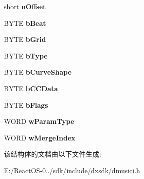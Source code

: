\begin{DoxyCompactItemize}
\item 
\mbox{\label{struct___d_m_u_s___c_u_r_v_e___p_m_s_g_a8b333c0d2ea156632d3e1329f680b70c}} 
short {\bfseries n\+Offset}
\item 
\mbox{\label{struct___d_m_u_s___c_u_r_v_e___p_m_s_g_a7d2f27715e230615d524f69a872780bd}} 
B\+Y\+TE {\bfseries b\+Beat}
\item 
\mbox{\label{struct___d_m_u_s___c_u_r_v_e___p_m_s_g_ab21b62e9a1f103e9eeb252a373531eb8}} 
B\+Y\+TE {\bfseries b\+Grid}
\item 
\mbox{\label{struct___d_m_u_s___c_u_r_v_e___p_m_s_g_aeb9d4603c54f1a8a19f0159c309634a9}} 
B\+Y\+TE {\bfseries b\+Type}
\item 
\mbox{\label{struct___d_m_u_s___c_u_r_v_e___p_m_s_g_a9156ca984261c0cfa4b21a504646f003}} 
B\+Y\+TE {\bfseries b\+Curve\+Shape}
\item 
\mbox{\label{struct___d_m_u_s___c_u_r_v_e___p_m_s_g_aeef8867da36fa2601f1a100112beb92a}} 
B\+Y\+TE {\bfseries b\+C\+C\+Data}
\item 
\mbox{\label{struct___d_m_u_s___c_u_r_v_e___p_m_s_g_a9bf622525321e618afdc0653288703fd}} 
B\+Y\+TE {\bfseries b\+Flags}
\item 
\mbox{\label{struct___d_m_u_s___c_u_r_v_e___p_m_s_g_a9ac4c685f4adad3c2f1513aee30074e8}} 
W\+O\+RD {\bfseries w\+Param\+Type}
\item 
\mbox{\label{struct___d_m_u_s___c_u_r_v_e___p_m_s_g_a0df32dd8be9c5180917c67744d536558}} 
W\+O\+RD {\bfseries w\+Merge\+Index}
\end{DoxyCompactItemize}


该结构体的文档由以下文件生成\+:\begin{DoxyCompactItemize}
\item 
E\+:/\+React\+O\+S-\/0../sdk/include/dxsdk/dmusici.\+h\end{DoxyCompactItemize}
